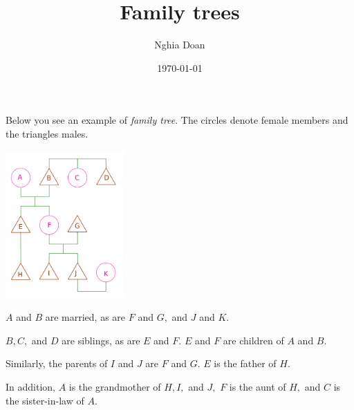\documentclass{article}
\title{Family trees}
\author{Nghia Doan}
\date{\today}
\begin{document}
\maketitle

Below you see an example of \textit{family tree}.
The circles denote female members and the triangles males.
\begin{center}
    \begin{minipage}[t]{6.5cm}
        \centering
        \includegraphics[width=4.5cm]{./svg/pdf/hc-2022-2-3-15-1.pdf}
    \end{minipage}
\end{center}

$A$ and $B$ are married, as are $F$ and $G,$ and $J$ and $K.$

$B, C,$ and $D$ are siblings, as are $E$ and $F.$
$E$ and $F$ are children of $A$ and $B.$

Similarly, the parents of $I$ and $J$ are $F$ and $G.$
$E$ is the father of $H.$

In addition, $A$ is the grandmother of $H, I,$ and $J,$
$F$ is the aunt of $H,$ and $C$ is the sister-in-law of $A.$

\newpage
\end{document}
